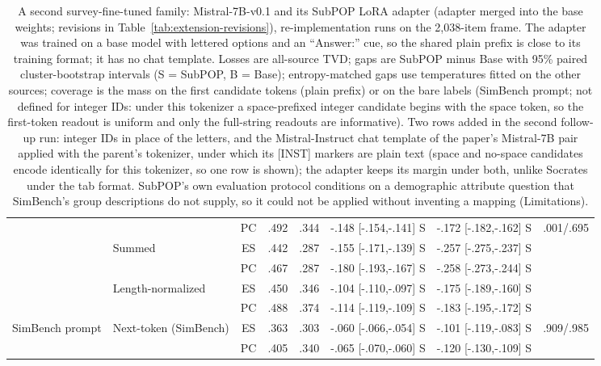 \begin{table}[t]
\begin{tabular}{@{}llcccccc@{}}
 &  & PC & .492 & .344 & -.148 [-.154,-.141] S & -.172 [-.182,-.162] S & .001/.695 \\
 & Summed & ES & .442 & .287 & -.155 [-.171,-.139] S & -.257 [-.275,-.237] S &  \\
 &  & PC & .467 & .287 & -.180 [-.193,-.167] S & -.258 [-.273,-.244] S &  \\
 & Length-normalized & ES & .450 & .346 & -.104 [-.110,-.097] S & -.175 [-.189,-.160] S &  \\
 &  & PC & .488 & .374 & -.114 [-.119,-.109] S & -.183 [-.195,-.172] S &  \\
SimBench prompt & Next-token (SimBench) & ES & .363 & .303 & -.060 [-.066,-.054] S & -.101 [-.119,-.083] S & .909/.985 \\
 &  & PC & .405 & .340 & -.065 [-.070,-.060] S & -.120 [-.130,-.109] S &  \\
\bottomrule
\end{tabular}
\caption{A second survey-fine-tuned family: Mistral-7B-v0.1 and its SubPOP LoRA adapter \cite{suh2025subpop} (adapter merged into the base weights; revisions in Table~\ref{tab:extension-revisions}), re-implementation runs on the 2,038-item frame. The adapter was trained on a base model with lettered options and an ``Answer:'' cue, so the shared plain prefix is close to its training format; it has no chat template. Losses are all-source TVD; gaps are SubPOP minus Base with 95\% paired cluster-bootstrap intervals (S = SubPOP, B = Base); entropy-matched gaps use temperatures fitted on the other sources; coverage is the mass on the first candidate tokens (plain prefix) or on the bare labels (SimBench prompt; not defined for integer IDs: under this tokenizer a space-prefixed integer candidate begins with the space token, so the first-token readout is uniform and only the full-string readouts are informative). Two rows added in the second follow-up run: integer IDs in place of the letters, and the Mistral-Instruct chat template of the paper's Mistral-7B pair applied with the parent's tokenizer, under which its [INST] markers are plain text (space and no-space candidates encode identically for this tokenizer, so one row is shown); the adapter keeps its margin under both, unlike Socrates under the tab format. SubPOP's own evaluation protocol conditions on a demographic attribute question that SimBench's group descriptions do not supply, so it could not be applied without inventing a mapping (Limitations).}
\label{tab:subpop}
\end{table}
